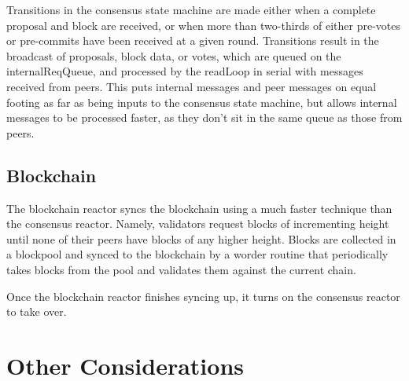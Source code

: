 Transitions in the consensus state machine are made either when a complete proposal and block are received,
or when more than two-thirds of either pre-votes or pre-commits have been received at a given round.
Transitions result in the broadcast of proposals, block data, or votes, which are queued on the internalReqQueue,
and processed by the readLoop in serial with messages received from peers.
This puts internal messages and peer messages on equal footing as far as being inputs to the consensus state machine, 
but allows internal messages to be processed faster, as they don't sit in the same queue as those from peers.

\subsection{Blockchain}

The blockchain reactor syncs the blockchain using a much faster technique than the consensus reactor.
Namely, validators request blocks of incrementing height until none of their peers have blocks of any higher height.
Blocks are collected in a blockpool and synced to the blockchain by a worder routine that periodically takes blocks from the pool
and validates them against the current chain.

Once the blockchain reactor finishes syncing up, it turns on the consensus reactor to take over.

\section{Other Considerations}
